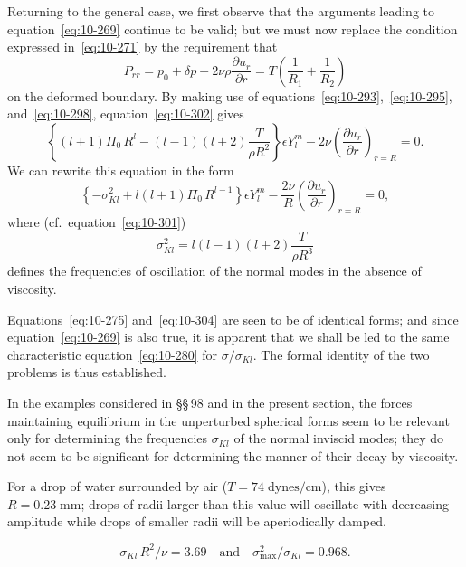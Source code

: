 Returning to the general case, we first observe that the arguments leading to equation~\eqref{eq:10-269} continue to be valid; but we must now replace the condition expressed in~\eqref{eq:10-271} by the requirement that
\begin{equation}
\label{eq:10-302}
P_{rr} = p_0+\delta p - 2\nu\rho\frac{\partial u_r}{\partial r} = T\!\left(\frac{1}{R_1}+\frac{1}{R_2}\right)
\end{equation}
on the deformed boundary. By making use of equations~\eqref{eq:10-293},~\eqref{eq:10-295}, and~\eqref{eq:10-298}, equation~\eqref{eq:10-302} gives
\begin{equation}
\label{eq:10-303}
\left\{(l+1)\Pi_0\,R^{l}-(l-1)(l+2)\frac{T}{\rho R^2}\right\}\epsilon Y_l^m - 2\nu\!\left(\frac{\partial u_r}{\partial r}\right)_{r=R} = 0.
\end{equation}
We can rewrite this equation in the form
\begin{equation}
\label{eq:10-304}
\left\{-\sigma_{Kl}^2+l(l+1)\Pi_0\,R^{l-1}\right\}\epsilon Y_l^m - \frac{2\nu}{R}\!\left(\frac{\partial u_r}{\partial r}\right)_{r=R} = 0,
\end{equation}
where (cf.\ equation~\eqref{eq:10-301})
\begin{equation}
\label{eq:10-305}
\sigma_{Kl}^2 = l(l-1)(l+2)\frac{T}{\rho R^3}
\end{equation}
defines the frequencies of oscillation of the normal modes in the absence of viscosity.

Equations~\eqref{eq:10-275} and~\eqref{eq:10-304} are seen to be of identical forms; and since equation~\eqref{eq:10-269} is also true, it is apparent that we shall be led to the same characteristic equation~\eqref{eq:10-280} for $\sigma/\sigma_{Kl}$. The formal identity of the two problems is thus established.

In the examples considered in \S\S\,98 and in the present section, the forces maintaining equilibrium in the unperturbed spherical forms seem to be relevant only for determining the frequencies $\sigma_{Kl}$ of the normal inviscid modes; they do not seem to be significant for determining the manner of their decay by viscosity.

For a drop of water surrounded by air ($T = 74\;\text{dynes/cm}$), this gives $R = 0.23\;\text{mm}$; drops of radii larger than this value will oscillate with decreasing amplitude while drops of smaller radii will be aperiodically damped.

\begin{equation}
\label{eq:10-306}
\sigma_{Kl}\,R^2/\nu = 3.69 \quad\text{and}\quad \sigma^2_{\max}/\sigma_{Kl} = 0.968.
\end{equation}

